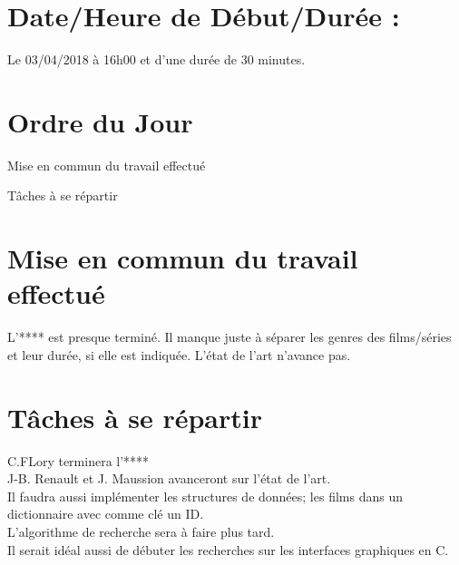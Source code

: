 \documentclass{meetingmins}
\begin{document}
\maketitle
\section{Date/Heure de Début/Durée :}
Le 03/04/2018 à 16h00 et d'une durée de 30 minutes.

\section{Ordre du Jour}
\begin{items}
\item
Mise en commun du travail effectué
\item
Tâches à se répartir
\end{items}

\section{Mise en commun du travail effectué}
L'**** est presque terminé. Il manque juste à séparer les genres des films/séries et leur durée, si elle est indiquée. 
L'état de l'art n'avance pas.

\section{Tâches à se répartir}
C.FLory terminera l'****
\\J-B. Renault et J. Maussion avanceront sur l'état de l'art.
\\Il faudra aussi implémenter les structures de données; les films dans un dictionnaire avec comme clé un ID.
\\L'algorithme de recherche sera à faire plus tard.
\\Il serait idéal aussi de débuter les recherches sur les interfaces graphiques en C.
\end{document}
